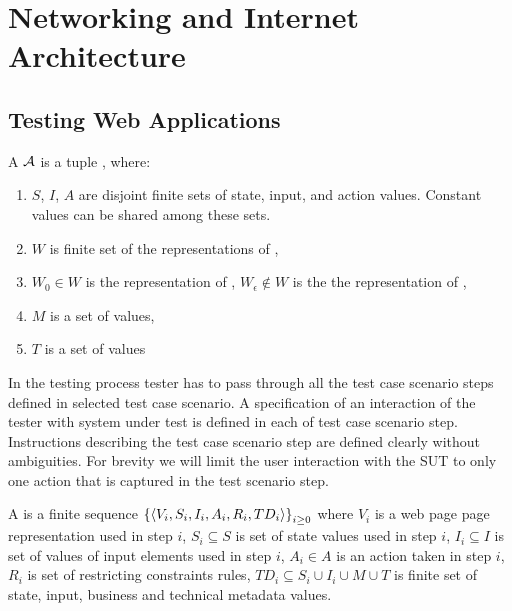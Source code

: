 \chapter{Networking and Internet Architecture}

\section{Testing Web Applications}

\begin{defi}
A  $\mathcal{A}$ is a tuple , where:
\begin{enumerate}
\item $S$, $I$, $A$ are disjoint finite sets of state, input, and action values. Constant values can be shared among these sets.
\item $W$ is finite set of the representations of ,
\item $W_0\in W$ is the representation of , $W_{\epsilon}\notin W$ is the the representation of ,
\item $M$ is a set of  values,
\item $T$ is a set of  values
\end{enumerate}
In the testing process tester has to pass through all the test case scenario steps defined in selected test case scenario. A specification of an interaction of the tester with system under test is defined in each of test case scenario step. Instructions describing the test case scenario step are defined clearly without ambiguities. For brevity we will limit the user interaction with the SUT to only one action that is captured in the test scenario step.
\cite{conf/fedcsis/FrajtakBJ12}
\end{defi}

\begin{defi}
A  is a finite sequence $\left\{ \left\langle V_i,S_i,I_i,A_i,R_i,TD_i\right\rangle\right\}_{i\geq 0}$ where $V_i$ is a web page page representation used in step $i$, $S_i\subseteq S$ is set of state values used in step $i$, $I_i\subseteq I$ is set of values of input elements used in step $i$, $A_i\in A$ is an action taken in step $i$, $R_i$ is set of restricting constraints rules, $TD_i\subseteq S_i\cup I_i\cup M\cup T$ is finite set of state, input, business and technical metadata values.
\cite{conf/fedcsis/FrajtakBJ12}
\end{defi}

